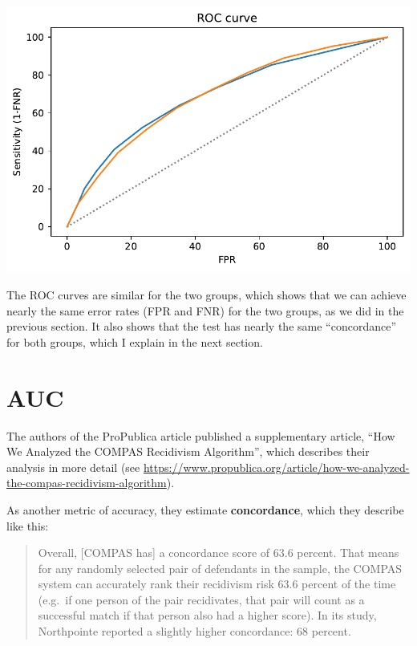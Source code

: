 \begin{center}
\includegraphics[scale=0.75]{02_calibration_files/02_calibration_66_0.pdf}
\end{center}

The ROC curves are similar for the two groups, which shows that we can
achieve nearly the same error rates (FPR and FNR) for the two groups, as
we did in the previous section. It also shows that the test has nearly
the same ``concordance'' for both groups, which I explain in the next
section.

\hypertarget{auc}{%
\section{AUC}\label{auc}}

The authors of the ProPublica article published a supplementary article,
``How We Analyzed the COMPAS Recidivism Algorithm'', which describes
their analysis in more detail (see
\url{https://www.propublica.org/article/how-we-analyzed-the-compas-recidivism-algorithm}).

As another metric of accuracy, they estimate \textbf{concordance}, which
they describe like this:

\begin{quote}
Overall, {[}COMPAS has{]} a concordance score of 63.6 percent. That
means for any randomly selected pair of defendants in the sample, the
COMPAS system can accurately rank their recidivism risk 63.6 percent of
the time (e.g.~if one person of the pair recidivates, that pair will
count as a successful match if that person also had a higher score). In
its study, Northpointe reported a slightly higher concordance: 68
percent.
\end{quote}

